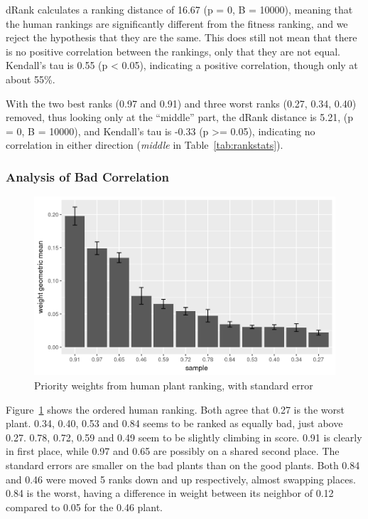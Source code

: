 dRank calculates a ranking distance of 16.67 (p = 0, B = 10000), meaning that the human rankings are significantly different from the fitness ranking, and we reject the hypothesis that they are the same.
This does still not mean that there is no positive correlation between the rankings, only that they are not equal.
Kendall's tau is 0.55 (p < 0.05), indicating a positive correlation, though only at about 55\%.

With the two best ranks (0.97 and 0.91) and three worst ranks (0.27, 0.34, 0.40) removed, thus looking only at the ``middle'' part, the dRank distance is 5.21, (p = 0, B = 10000), and Kendall's tau is -0.33 (p >= 0.05), indicating no correlation in either direction (\textit{middle} in Table~\ref{tab:rankstats}).


\subsubsection{Analysis of Bad Correlation}
\begin{figure}
    \centering
    \includegraphics[width=1.0\textwidth]{figures/weights_bar}
    \caption[Priority weights from human plant ranking]{Priority weights from human plant ranking, with standard error}
    \label{fig:weights-bar}
\end{figure}

Figure~\ref{fig:weights-bar} shows the ordered human ranking.
Both agree that 0.27 is the worst plant.
0.34, 0.40, 0.53 and 0.84 seems to be ranked as equally bad, just above 0.27.
0.78, 0.72, 0.59 and 0.49 seem to be slightly climbing in score.
0.91 is clearly in first place, while 0.97 and 0.65 are possibly on a shared second place.
The standard errors are smaller on the bad plants than on the good plants.
Both 0.84 and 0.46 were moved 5 ranks down and up respectively, almost swapping places.
0.84 is the worst, having a difference in weight between its neighbor of 0.12 compared to 0.05 for the 0.46 plant.


